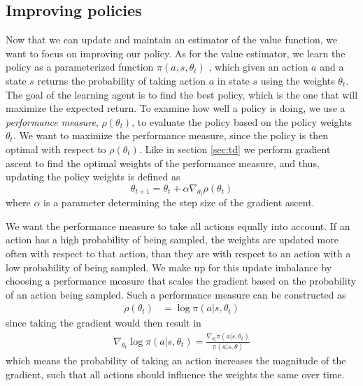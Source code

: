 \documentclass[11pt]{article}
\begin{document}
\subsection{Improving policies}

Now that we can update and maintain an estimator of the value function, we want
to focus on improving our policy.
As for the value estimator, we learn the policy as a parameterized function $\pi(a, s, \theta_t)$
, which given an action $a$ and a state $s$ returns the probability
of taking action $a$ in state $s$ using the weights $\theta_t$.
The goal of the learning agent is to find the best policy, which is the one 
that will maximize the expected return.
To examine how well a policy is doing, we use a \textit{performance measure}, $\rho(\theta_t)$, to evaluate
the policy based on the policy weights $\theta_t$.
We want to maximize the performance measure, since the policy is then optimal with
respect to $\rho(\theta_t)$.
Like in section \ref{sec:td}
we perform gradient ascent to find the optimal weights of the performance measure,
and thus, updating the policy weights is defined as
\begin{equation}
    \theta_{t+1} = \theta_t + \alpha \nabla_{\theta_t} \rho(\theta_t)
\end{equation}
where $\alpha$ is a parameter determining the step size of the gradient ascent.

We want the performance measure to take all actions equally into account.
If an action has a high probability of being sampled, the weights are
updated more often with respect to that action, than they are with respect to an
action with a low probability of being sampled.
We make up for this update imbalance by choosing a performance measure
that scales the gradient based on the probability of an action being sampled.
Such a performance measure can be constructed as
\begin{equation}
    \begin{aligned}
        \rho(\theta_t) & = \log\pi(a|s, \theta_t)
    \end{aligned}
\end{equation}
since taking the gradient would then result in
\begin{equation}\label{per_mes}
    \begin{aligned}
        \nabla_{\theta_t} \log\pi(a|s, \theta_t) = \frac{\nabla_{\theta_t}\pi(a|s, \theta_t)}{\pi(a|s,\theta)}
    \end{aligned}
\end{equation}
which means the probability of taking an action increases the magnitude of the gradient,
such that all actions should influence the weights the same over time.
\end{document}
